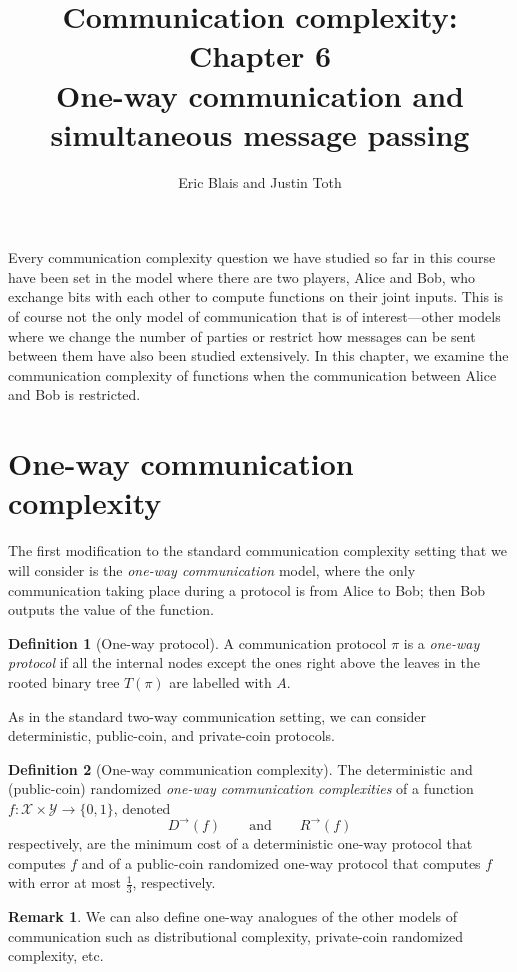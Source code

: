 \documentclass[11pt]{amsart}
\title{Communication complexity: Chapter 6 \\ One-way communication and simultaneous message passing}
\author{Eric Blais and Justin Toth}
\theoremstyle{plain}
\theoremstyle{definition}
\newtheorem{definition}{Definition}
\newtheorem{remark}{Remark}
\theoremstyle{plain}
\newcommand{\calX}{\mathcal{X}}
\newcommand{\calY}{\mathcal{Y}}
\begin{document}
\maketitle

Every communication complexity question we have studied so far in this course have been set in the model where there are two players, Alice and Bob, who exchange bits with each other to compute functions on their joint inputs. This is of course not the only model of communication that is of interest---other models where we change the number of parties or restrict how messages can be sent between them have also been studied extensively. In this chapter, we examine the communication complexity of functions when the communication between Alice and Bob is restricted.



\newpage 
\section{One-way communication complexity}

The first modification to the standard communication complexity setting that we will consider is the \emph{one-way communication} model, where the only communication taking place during a protocol is from Alice to Bob; then Bob outputs the value of the function.

\begin{definition}[One-way protocol]
A communication protocol $\pi$ is a \emph{one-way protocol} if all the internal nodes except the ones right above the leaves in the rooted binary tree $T(\pi)$ are labelled with $A$.
\end{definition}

As in the standard two-way communication setting, we can consider deterministic, public-coin, and private-coin protocols.

\begin{definition}[One-way communication complexity]
The deterministic and (public-coin) randomized \emph{one-way communication complexities} of a function $f : \calX \times \calY \to \{0,1\}$, denoted
\[
D^{\rightarrow}(f) \qquad \mbox{and} \qquad R^{\rightarrow}(f)
\]
respectively, are the minimum cost of a deterministic one-way protocol that computes $f$ and of a public-coin randomized one-way protocol that computes $f$ with error at most $\frac13$, respectively.
\end{definition}

\begin{remark}
We can also define one-way analogues of the other models of communication such as distributional complexity, private-coin randomized complexity, etc.
\end{remark}
\end{document}
